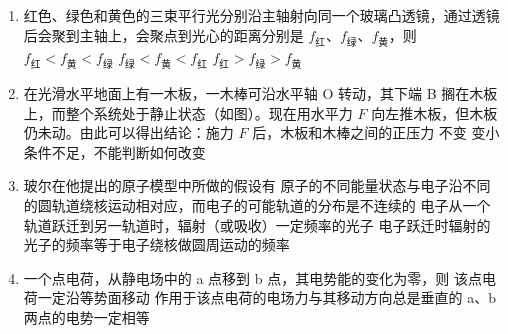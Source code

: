 \documentclass[\gkver]{gaokaozhenti}
\begin{document}
\begin{enumerate}
\item
红色、绿色和黄色的三束平行光分别沿主轴射向同一个玻璃凸透镜，通过透镜后会聚到主轴上，会聚点到光心的距离分别是 $f_{\text{红}}$、$f_{\text{绿}}$、$f_{\text{黄}}$，则
{$f_{\text{红}}<f_{\text{黄}}<f_{\text{绿}}$}
{$f_{\text{绿}}<f_{\text{黄}}<f_{\text{红}}$}
{$f_{\text{红}}>f_{\text{绿}}>f_{\text{黄}}$}


\item
在光滑水平地面上有一木板，一木棒可沿水平轴 O 转动，其下端 B 搁在木板上，而整个系统处于静止状态（如图）。现在用水平力 $F$ 向左推木板，但木板仍未动。由此可以得出结论：施力 $F$ 后，木板和木棒之间的正压力
\onepicture[w=4.5cm]{}
{不变}
{变小}
{条件不足，不能判断如何改变}


\item
玻尔在他提出的原子模型中所做的假设有
{原子的不同能量状态与电子沿不同的圆轨道绕核运动相对应，而电子的可能轨道的分布是不连续的}
{电子从一个轨道跃迁到另一轨道时，辐射（或吸收）一定频率的光子}
{电子跃迁时辐射的光子的频率等于电子绕核做圆周运动的频率}


\item
一个点电荷，从静电场中的 a 点移到 b 点，其电势能的变化为零，则
{该点电荷一定沿等势面移动}
{作用于该点电荷的电场力与其移动方向总是垂直的}
{a、b 两点的电势一定相等}


\end{enumerate}
\end{document}
